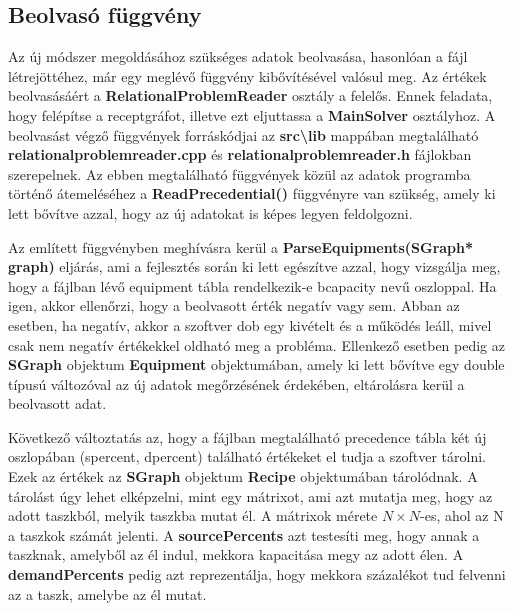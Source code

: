 \subsection{Beolvasó függvény}
Az új módszer megoldásához szükséges adatok beolvasása, hasonlóan a fájl létrejöttéhez, már egy meglévő függvény kibővítésével valósul meg. Az értékek beolvasásáért a \textbf{RelationalProblemReader} osztály a felelős. Ennek feladata, hogy felépítse a receptgráfot, illetve ezt eljuttassa a \textbf{MainSolver} osztályhoz. A beolvasást végző függvények forráskódjai az \textbf{src\textbackslash lib} mappában megtalálható \textbf{relationalproblemreader.cpp} és \textbf{relationalproblemreader.h} fájlokban szerepelnek. Az ebben megtalálható függvények közül az adatok programba történő átemeléséhez a \textbf{ReadPrecedential()} függvényre van szükség, amely ki lett bővítve azzal, hogy az új adatokat is képes legyen feldolgozni. 

Az említett függvényben meghívásra kerül a \textbf{ParseEquipments(SGraph* graph)} eljárás, ami a fejlesztés során ki lett egészítve azzal, hogy vizsgálja meg, hogy a fájlban lévő equipment tábla rendelkezik-e b\textunderscore capacity nevű oszloppal.
Ha igen, akkor ellenőrzi, hogy a beolvasott érték negatív vagy sem. Abban az esetben, ha negatív, akkor a szoftver dob egy kivételt és a működés leáll, mivel csak nem negatív értékekkel oldható meg a probléma. Ellenkező esetben pedig az \textbf{SGraph} objektum \textbf{Equipment} objektumában, amely ki lett bővítve egy double típusú változóval az új adatok megőrzésének érdekében, eltárolásra kerül a beolvasott adat.

Következő változtatás az, hogy a fájlban megtalálható precedence tábla két új oszlopában (s\textunderscore percent, d\textunderscore percent) található értékeket el tudja a szoftver tárolni. Ezek az értékek az \textbf{SGraph} objektum \textbf{Recipe} objektumában tárolódnak. A tárolást úgy lehet elképzelni, mint egy mátrixot, ami azt mutatja meg, hogy az adott taszkból, melyik taszkba mutat él. A mátrixok mérete $N\times N$-es, ahol az N a taszkok számát jelenti. A \textbf{sourcePercents} azt testesíti meg, hogy annak a taszknak, amelyből az él indul, mekkora kapacitása megy az adott élen. A \textbf{demandPercents} pedig azt reprezentálja, hogy mekkora százalékot tud felvenni az a taszk, amelybe az él mutat.
